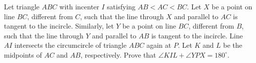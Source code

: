 Let triangle $ABC$ with incenter $I$ satisfying $AB < AC < BC$.
Let $X$ be a point on line $BC$, different from $C$,
such that the line through $X$ and parallel to $AC$ is tangent to the incircle.
Similarly, let $Y$ be a point on line $BC$, different from $B$,
such that the line through $Y$ and parallel to $AB$ is tangent to the incircle.
Line $AI$ intersects the circumcircle of triangle $ABC$ again at $P$.
Let $K$ and $L$ be the midpoints of $AC$ and $AB$, respectively.
Prove that $\angle KIL + \angle YPX = 180^{\circ}$.